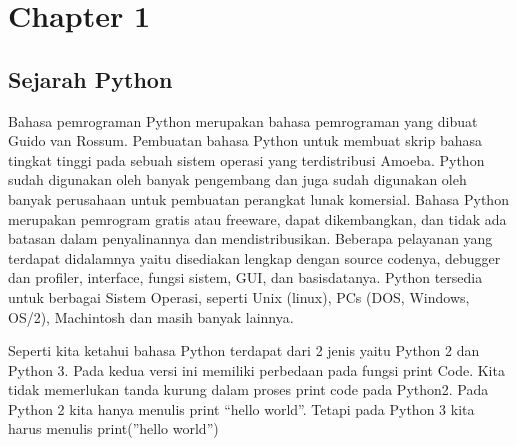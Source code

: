 

\chapter*{Chapter 1}
\section*{Sejarah Python}
\par

 
Bahasa pemrograman Python merupakan bahasa pemrograman yang dibuat Guido van Rossum. Pembuatan bahasa Python untuk membuat skrip bahasa tingkat tinggi pada sebuah sistem operasi yang terdistribusi Amoeba. Python sudah digunakan oleh banyak pengembang dan juga sudah digunakan oleh banyak perusahaan untuk pembuatan perangkat lunak komersial.
Bahasa Python merupakan pemrogram gratis atau freeware, dapat dikembangkan, dan tidak ada batasan dalam penyalinannya dan mendistribusikan. Beberapa pelayanan yang terdapat didalamnya yaitu disediakan lengkap dengan source codenya, debugger dan profiler, interface, fungsi sistem, GUI, dan basisdatanya. Python tersedia untuk berbagai Sistem Operasi, seperti Unix (linux), PCs (DOS, Windows, OS/2), Machintosh dan masih banyak lainnya.

\par
    
 Seperti kita ketahui bahasa Python terdapat dari 2 jenis yaitu Python 2 dan Python 3. Pada kedua versi ini memiliki perbedaan pada fungsi print Code. Kita tidak memerlukan tanda kurung dalam proses print code pada Python2. Pada Python 2 kita hanya menulis print “hello world”. Tetapi pada Python 3 kita harus menulis print(”hello world”)

